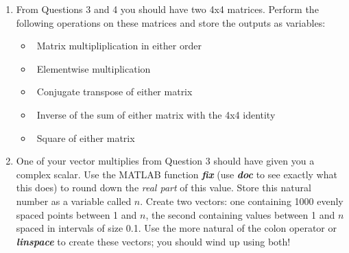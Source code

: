 \documentclass{article}
\begin{document}
\begin{enumerate}[leftmargin=0cm,itemindent=.5cm,labelwidth=\itemindent,labelsep=0cm,align=left,label=\textbf{\arabic*.}]
\item From Questions 3 and 4 you should have two 4x4 matrices. Perform the following operations on these matrices and store the outputs as variables:
	\begin{itemize}
		\item $\:\:$Matrix multipliplication in either order
		\item $\:\:$Elementwise multiplication
		\item $\:\:$Conjugate transpose of either matrix
		\item $\:\:$Inverse of the sum of either matrix with the 4x4 identity
		\item $\:\:$Square of either matrix
	\end{itemize}
\item One of your vector multiplies from Question 3 should have given you a complex scalar. Use the MATLAB function \textit{\textbf{fix}} (use \textit{\textbf{doc}} to see exactly what this does) to round down the \textit{real part} of this value. Store this natural number as a variable called $n$. Create two vectors: one containing 1000 evenly spaced points between 1 and $n$, the second containing values between 1 and $n$ spaced in intervals of size 0.1. Use the more natural of the colon operator or \textit{\textbf{linspace}} to create these vectors; you should wind up using both!
\end{enumerate}
\end{document}
